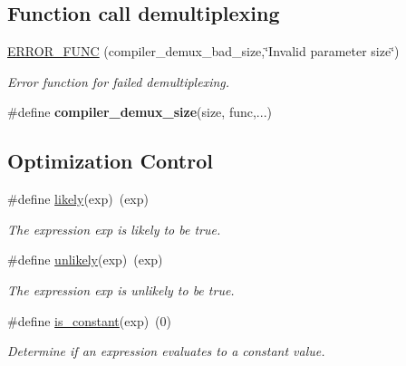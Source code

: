 \subsection*{Function call demultiplexing}
\begin{DoxyCompactItemize}
\item 
\hypertarget{group__group__xmega__utils_ga172353ef2e725a5d8736764b9c4453f8}{\hyperlink{group__group__xmega__utils_ga172353ef2e725a5d8736764b9c4453f8}{E\-R\-R\-O\-R\-\_\-\-F\-U\-N\-C} (compiler\-\_\-demux\-\_\-bad\-\_\-size,\char`\"{}Invalid parameter size\char`\"{})}\label{group__group__xmega__utils_ga172353ef2e725a5d8736764b9c4453f8}

\begin{DoxyCompactList}\small\item\em Error function for failed demultiplexing. \end{DoxyCompactList}\item 
\#define {\bfseries compiler\-\_\-demux\-\_\-size}(size, func,...)
\end{DoxyCompactItemize}
\subsection*{Optimization Control}
\begin{DoxyCompactItemize}
\item 
\hypertarget{group__group__xmega__utils_gac082df2dd9a1024f6e8d16a61855d989}{\#define \hyperlink{group__group__xmega__utils_gac082df2dd9a1024f6e8d16a61855d989}{likely}(exp)~(exp)}\label{group__group__xmega__utils_gac082df2dd9a1024f6e8d16a61855d989}

\begin{DoxyCompactList}\small\item\em The expression {\itshape exp} is likely to be true. \end{DoxyCompactList}\item 
\hypertarget{group__group__xmega__utils_ga1c0c89beb84d05c5ba0bc7ce527a3925}{\#define \hyperlink{group__group__xmega__utils_ga1c0c89beb84d05c5ba0bc7ce527a3925}{unlikely}(exp)~(exp)}\label{group__group__xmega__utils_ga1c0c89beb84d05c5ba0bc7ce527a3925}

\begin{DoxyCompactList}\small\item\em The expression {\itshape exp} is unlikely to be true. \end{DoxyCompactList}\item 
\#define \hyperlink{group__group__xmega__utils_ga15892ad6884af110e5eaaa96994ebaa9}{is\-\_\-constant}(exp)~(0)
\begin{DoxyCompactList}\small\item\em Determine if an expression evaluates to a constant value. \end{DoxyCompactList}\end{DoxyCompactItemize}
